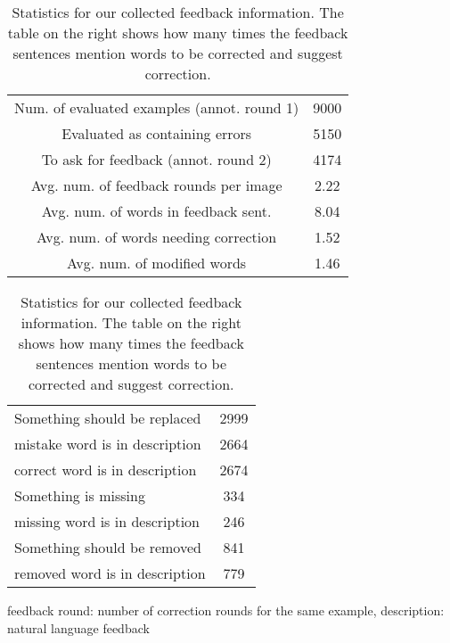 \begin{table}[t!]
 \centering
      \caption{\small Statistics for our collected feedback information. The table on the right shows how many times the feedback sentences mention words to be corrected and suggest correction.}
        \small
        \vspace{-2mm}
  \label{tab:feedback-data}
  \begin{minipage}{0.5\linewidth}
  \addtolength{\tabcolsep}{0.5pt}
  \begin{tabular}{cc}
    \toprule
    Num. of evaluated examples (annot. round 1) & 9000\\
    Evaluated as containing errors & 5150\\
    To ask for feedback (annot. round 2) & 4174\\
         \hline
             Avg. num. of feedback rounds per image & 2.22 \\ 
             Avg. num. of words in feedback sent. & 8.04 \\
    Avg. num. of words needing correction & 1.52 \\
    Avg. num. of modified words & 1.46 \\
     \bottomrule
     \end{tabular}
    \end{minipage}
    \hspace{4mm}
    \begin{minipage}{0.46\linewidth}
    \begin{tabular}{lc}
    \toprule
    Something should be replaced & 2999 \\
    \hspace{7mm}mistake word is in description & 2664\\
    \hspace{7mm}correct word is in description & 2674\\
         \hline
   Something is missing & 334 \\
    \hspace{7mm}missing word is in description & 246\\
    \hline
    Something should be removed & 841 \\
     \hspace{7mm}removed word is in description & 779\\
    \bottomrule
  \end{tabular}
   \end{minipage}
   \footnotesize
   feedback round: number of correction rounds for the same example, %
   description: natural language feedback\\[1mm]
  \end{table}

